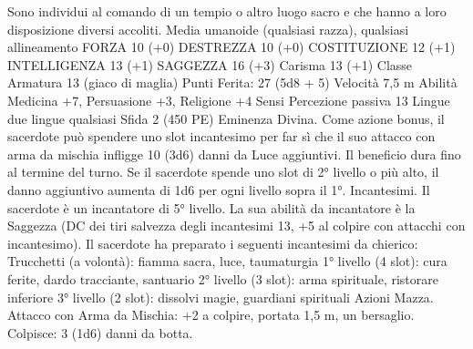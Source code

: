 \begin{multicols}{2}
Sono individui al comando di un tempio o altro luogo
sacro e che hanno a loro disposizione diversi accoliti.
Media umanoide (qualsiasi razza), qualsiasi allineamento
FORZA 10 (+0)
DESTREZZA 10 (+0)
COSTITUZIONE 12 (+1)
INTELLIGENZA 13 (+1)
SAGGEZZA 16 (+3)
Carisma 13 (+1)
Classe Armatura 13 (giaco di maglia)
\hspace*{0pt}\hfill{Punti Ferita}: 27 (5d8 + 5)
Velocità 7,5 m
Abilità Medicina +7, Persuasione +3, Religione +4
Sensi Percezione passiva 13
Lingue due lingue qualsiasi
Sfida 2 (450 PE)
Eminenza Divina. Come azione bonus, il sacerdote può spendere
uno slot incantesimo per far sì che il suo attacco con arma da
mischia infligge 10 (3d6) danni da Luce aggiuntivi. Il beneficio
dura fino al termine del turno. Se il sacerdote spende uno slot di
2° livello o più alto, il danno aggiuntivo aumenta di 1d6 per ogni
livello sopra il 1°.
Incantesimi. Il sacerdote è un incantatore di 5° livello. La sua
abilità da incantatore è la Saggezza (DC dei tiri salvezza degli
incantesimi 13, +5 al colpire con attacchi con incantesimo). Il
sacerdote ha preparato i seguenti incantesimi da chierico:
Trucchetti (a volontà): fiamma sacra, luce, taumaturgia
1° livello (4 slot): cura ferite, dardo tracciante, santuario
2° livello (3 slot): arma spirituale, ristorare inferiore
3° livello (2 slot): dissolvi magie, guardiani spirituali
Azioni
Mazza. Attacco con Arma da Mischia: +2 a colpire, portata 1,5
m, un bersaglio.
Colpisce: 3 (1d6) danni da botta.
 

\end{multicols}

